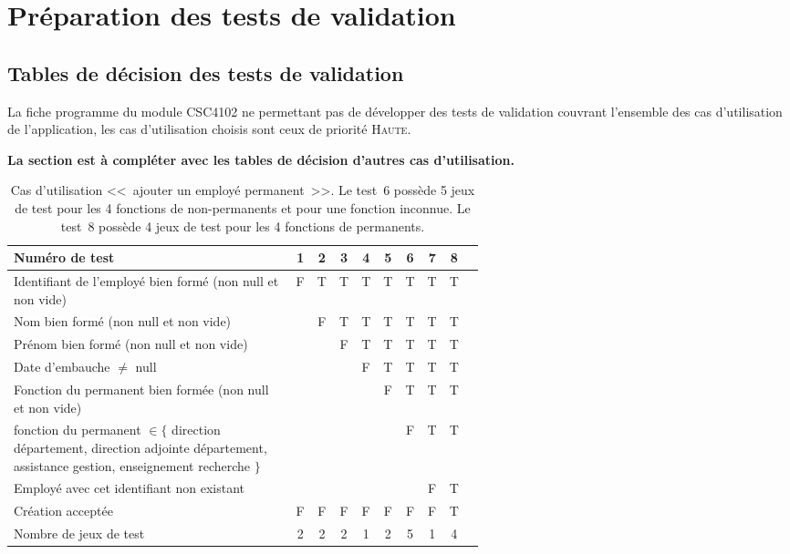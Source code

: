 \documentclass[11pt,article]{article}
\newcommand{\nullvalue}{\textsf{null}\xspace}
\begin{document}
\newpage

\section{Préparation des tests de validation}

\subsection{Tables de décision des tests de validation}

La fiche programme du module CSC4102 ne permettant pas de développer
des tests de validation couvrant l'ensemble des cas d'utilisation de
l'application, les cas d'utilisation choisis sont ceux de priorité
\textsc{Haute}.

\bigskip

{\color{red}\textbf{La section est à compléter avec les tables de
    décision d'autres cas d'utilisation.}}

\bigskip

\begin{table}[htbp!]
\begin{tabular}{|p{0.6\linewidth}|c|c|c|c|c|c|c|c|c|}
\hline
Numéro de test
&1&2&3&4&5&6&7&8\\
\hline
\hline
Identifiant de l'employé bien formé (non \nullvalue et non vide)
&F&T&T&T&T&T&T&T\\
\hline
Nom bien formé (non \nullvalue et non vide)
& &F&T&T&T&T&T&T\\
\hline
Prénom bien formé (non \nullvalue et non vide)
& & &F&T&T&T&T&T\\
\hline
Date d'embauche $\neq$ \nullvalue
& & & &F&T&T&T&T\\
\hline
Fonction du permanent bien formée (non \nullvalue et non vide)
& & & & &F&T&T&T\\
\hline
fonction du permanent $\in \{$ direction département, direction adjointe département, assistance gestion, enseignement recherche $\}$
& & & & & &F&T&T\\
\hline
Employé avec cet identifiant non existant
& & & & & & &F&T\\
\hline
\hline
Création acceptée
&F&F&F&F&F&F&F&T\\
\hline
\hline
Nombre de jeux de test 
&2&2&2&1&2&5&1&4\\
\hline
\end{tabular}
\caption{Cas d'utilisation <<~ajouter un employé permanent~>>. Le
  test~6 possède 5 jeux de test pour les 4 fonctions de non-permanents
  et pour une fonction inconnue. Le test~8 possède 4 jeux de test pour
  les 4 fonctions de permanents.}
\end{table}
\end{document}
